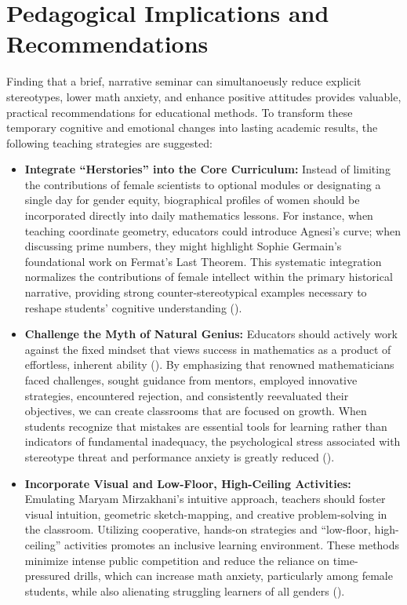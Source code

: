 \section{Pedagogical Implications and Recommendations}

Finding that a brief, narrative seminar can simultanoeusly reduce explicit stereotypes, lower math anxiety, and enhance positive attitudes provides valuable, practical recommendations for educational methods.
To transform these temporary cognitive and emotional changes into lasting academic results, the following teaching strategies are suggested:

\begin{itemize}
    \item \textbf{Integrate ``Herstories'' into the Core Curriculum:} Instead of limiting the contributions of female scientists to optional modules or designating a single day for gender equity, biographical profiles of women should be incorporated directly into daily mathematics lessons. For instance, when teaching coordinate geometry, educators could introduce Agnesi's curve; when discussing prime numbers, they might highlight Sophie Germain's foundational work on Fermat's Last Theorem. This systematic integration normalizes the contributions of female intellect within the primary historical narrative, providing strong counter-stereotypical examples necessary to reshape students' cognitive understanding (\cite{Greenwald2002}).
    \item  \textbf{Challenge the Myth of Natural Genius:} Educators should actively work against the fixed mindset that views success in mathematics as a product of effortless, inherent ability (\cite{Dweck2008}). By emphasizing that renowned mathematicians faced challenges, sought guidance from mentors, employed innovative strategies, encountered rejection, and consistently reevaluated their objectives, we can create classrooms that are focused on growth. When students recognize that mistakes are essential tools for learning rather than indicators of fundamental inadequacy, the psychological stress associated with stereotype threat and performance anxiety is greatly reduced (\cite{Schmader2008}).
    \item \textbf{Incorporate Visual and Low-Floor, High-Ceiling Activities:} Emulating Maryam Mirzakhani's intuitive approach, teachers should foster visual intuition, geometric sketch-mapping, and creative problem-solving in the classroom. Utilizing cooperative, hands-on strategies and ``low-floor, high-ceiling'' activities promotes an inclusive learning environment. These methods minimize intense public competition and reduce the reliance on time-pressured drills, which can increase math anxiety, particularly among female students, while also alienating struggling learners of all genders (\cite{Boaler2016}).

\end{itemize}
